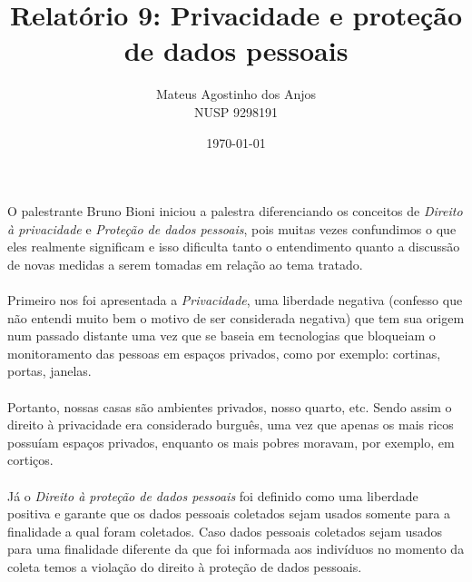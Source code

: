 \documentclass[12pt]{article}
\title{Relatório 9: Privacidade e proteção de dados pessoais}
\author{Mateus Agostinho dos Anjos\\NUSP 9298191}
\date{\today}
\begin{document}
	\maketitle
	\paragraph{}
		O palestrante Bruno Bioni iniciou a palestra diferenciando os conceitos
		de \textit{Direito à privacidade} e \textit{Proteção de dados pessoais}, pois
		muitas vezes confundimos o que eles realmente significam e isso dificulta
		tanto o entendimento quanto a discussão de novas medidas a serem tomadas
		em relação ao tema tratado.
	\paragraph{}
		Primeiro nos foi apresentada a \textit{Privacidade}, 	uma liberdade 
		negativa (confesso que não entendi muito bem o motivo
		de ser considerada negativa) que tem sua origem num passado distante
		uma vez que se baseia em tecnologias que bloqueiam o monitoramento das 
		pessoas em espaços privados, como por exemplo: cortinas, portas, janelas.
	\paragraph{}
		Portanto, nossas casas são ambientes privados, nosso quarto, etc. Sendo assim
		o direito à privacidade era considerado burguês, uma vez que apenas os mais 
		ricos possuíam espaços privados, enquanto os mais pobres moravam, por
		exemplo, em cortiços.
	\paragraph{}
		Já o 	\textit{Direito à proteção de dados pessoais} foi definido
		como uma liberdade positiva e garante que os dados pessoais coletados
		sejam usados somente para a finalidade a qual foram coletados. Caso
		dados pessoais coletados sejam usados para uma finalidade diferente
		da que foi informada aos indivíduos no momento da coleta temos a 
		violação do direito à proteção de dados pessoais.
\end{document}
